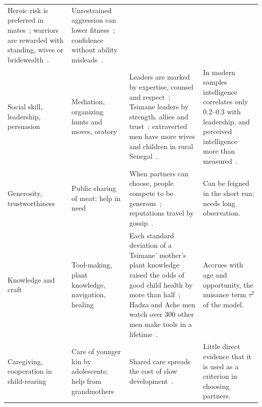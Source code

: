 \begin{table}[t]
\begin{tabularx}{\textwidth}{@{}P{0.125\textwidth}P{0.19\textwidth}LP{0.25\textwidth}@{}}
Heroic risk is preferred in mates~\cite{farthing2005}; warriors are rewarded with standing, wives or
bridewealth~\cite{glowacki2013,glowacki2015}. &
Unrestrained aggression can lower fitness~\cite{beckerman2009}; confidence without ability misleads~\cite{murphy2015}.\\
Social skill, leadership, persuasion & Mediation, organizing hunts and moves, oratory &
Leaders are marked by expertise, counsel and respect~\cite{garfield2019}; Tsimane leaders by strength, allies and
trust~\cite{vonrueden2014}; extraverted men have more wives and children in rural Senegal~\cite{alvergne2010}. &
In modern samples intelligence correlates only 0.2--0.3 with leadership, and perceived intelligence more than
measured~\cite{judge2004}.\\
Generosity, trustworthiness & Public sharing of meat; help in need &
When partners can choose, people compete to be generous~\cite{barclay2007}; reputations travel by
gossip~\cite{dunbar2004,sommerfeld2007}. & Can be feigned in the short run; needs long observation.\\
Knowledge and craft & Tool-making, plant knowledge, navigation, healing &
Each standard deviation of a Tsimane' mother's plant knowledge raised the odds of good child health by more than
half~\cite{mcdade2007}; Hadza and Ache men watch over 300 other men make tools in a lifetime~\cite{hill2014}. &
Accrues with age and opportunity, the nuisance term $\tau^2$ of the model.\\
Caregiving, cooperation in child-rearing & Care of younger kin by adolescents; help from grandmothers &
Shared care spreads the cost of slow development~\cite{hawkes1998,burkart2014}. & Little direct evidence that it is used as a
criterion in choosing partners.\\
\bottomrule
\end{tabularx}
\end{table}
